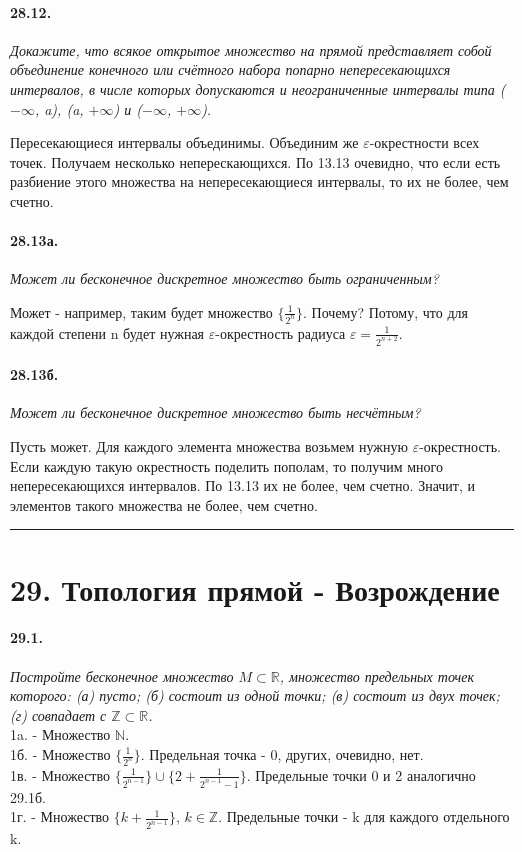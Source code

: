 \documentclass{book}
\begin{document}
\paragraph{28.12.}
\textit{Докажите, что всякое открытое множество на прямой представляет собой объединение конечного или счётного набора попарно непересекающихся интервалов, в числе которых допускаются и неограниченные интервалы типа ($-\infty$, a), (a, $+\infty$) и ($-\infty$, $+\infty$).}

Пересекающиеся интервалы объединимы. Объединим же $\varepsilon$-окрестности всех точек. Получаем несколько неперескающихся. По 13.13 очевидно, что если есть разбиение этого множества на непересекающиеся интервалы, то их не более, чем счетно.


\paragraph{28.13а.}
\textit{Может ли бесконечное дискретное множество быть ограниченным?}

Может - например, таким будет множество $\{\frac{1}{2^n}\}$. Почему? Потому, что для каждой степени n будет нужная $\varepsilon$-окрестность радиуса $\varepsilon = \frac{1}{2^{n+2}}$.

\paragraph{28.13б.}
\textit{Может ли бесконечное дискретное множество быть несчётным?}

Пусть может. Для каждого элемента множества возьмем нужную $\varepsilon$-окрестность. Если каждую такую окрестность поделить пополам, то получим много непересекающихся интервалов. По 13.13 их не более, чем счетно. Значит, и элементов такого множества не более, чем счетно.

\medskip \hrule \medskip

\section*{29. Топология прямой - Возрождение}


\paragraph{29.1.}
\textit{Постройте бесконечное множество $M \subset \mathbb{R}$, множество предельных точек которого: (а) пусто; (б) состоит из одной точки; (в) состоит из двух точек; (г) совпадает с $\mathbb{Z} \subset  \mathbb{R}$.} \\
1a. -  Множество $\mathbb{N}$. \\
	1б. - Множество $\{\frac{1}{2^n}\}$. Предельная точка - 0, других, очевидно, нет. \\
	1в. - Множество $\{\frac{1}{2^{n-1}}\} \cup  \{2 + \frac{1}{2^{n-1}-1}\}$. Предельные точки 0 и 2 аналогично 29.1б. \\
	1г. -  Множество $\{k + \frac{1}{2^{n-1}}\}$, $k \in \mathbb{Z}$. Предельные точки - k для каждого отдельного k.
	
\end{document}
